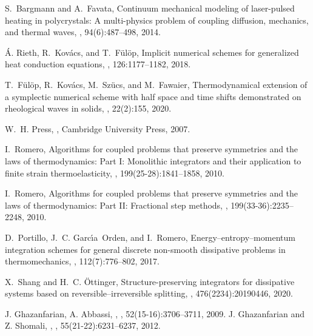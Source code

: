 \documentclass[sn-mathphys]{sn-jnl}%
\theoremstyle{thmstyleone}%
\theoremstyle{thmstyletwo}%
\theoremstyle{thmstylethree}%
\begin{document}
\begin{thebibliography}{9}
	S.~Bargmann and A.~Favata,
	\newblock Continuum mechanical modeling of laser-pulsed heating in
	polycrystals: {A} multi-physics problem of coupling diffusion, mechanics, and
	thermal waves,
	, 94(6):487--498, 2014.
	
	\'A. Rieth, R.~Kov\'acs, and T.~F\"ul\"op,
	\newblock Implicit numerical schemes for generalized heat conduction equations,
	, 126:1177--1182, 2018.
	
	T.~F\"ul\"op, R.~Kov\'acs, M.~Sz\"ucs, and M.~Fawaier,
	\newblock Thermodynamical extension of a symplectic numerical scheme with half
	space and time shifts demonstrated on rheological waves in solids,
	, 22(2):155, 2020.
	
	W.~H. Press,
	,
	\newblock Cambridge University Press, 2007.
	
	I.~Romero,
	\newblock Algorithms for coupled problems that preserve symmetries and the laws
	of thermodynamics: Part {I}: Monolithic integrators and their application to
	finite strain thermoelasticity,
	,
	199(25-28):1841--1858, 2010.
	
	I.~Romero,
	\newblock Algorithms for coupled problems that preserve symmetries and the laws
	of thermodynamics: Part {II}: Fractional step methods,
	,
	199(33-36):2235--2248, 2010.
	
	D.~Portillo, J.~C. Garc{\'\i}a~Orden, and I.~Romero,
	\newblock Energy--entropy--momentum integration schemes for general discrete
	non-smooth dissipative problems in thermomechanics,
	,
	112(7):776--802, 2017.
	
	X.~Shang and H.~C. {\"O}ttinger,
	\newblock Structure-preserving integrators for dissipative systems based on
	reversible--irreversible splitting,
	, 476(2234):20190446, 2020.
	
	J. Ghazanfarian, A. Abbassi, , , 52(15-16):3706--3711, 2009.
	J. Ghazanfarian and Z. Shomali, , , 55(21-22):6231--6237, 2012.
	

\end{thebibliography}
\end{document}
